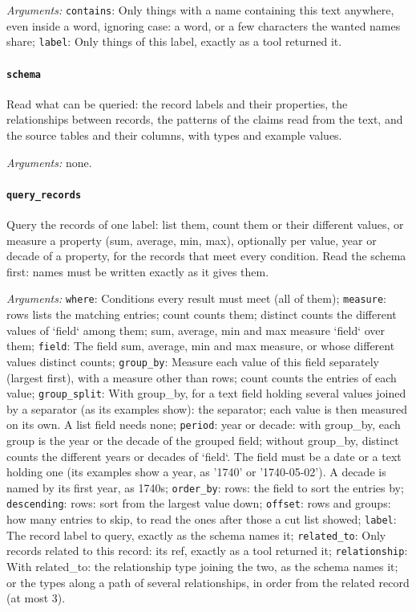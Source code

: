 \noindent\emph{Arguments:} \texttt{contains}: Only things with a name containing this text anywhere, even inside a word, ignoring case: a word, or a few characters the wanted names share; \texttt{label}: Only things of this label, exactly as a tool returned it.

\paragraph{\texttt{schema}} Read what can be queried: the record labels and their properties, the relationships between records, the patterns of the claims read from the text, and the source tables and their columns, with types and example values.

\noindent\emph{Arguments:} none.

\paragraph{\texttt{query\_records}} Query the records of one label: list them, count them or their different values, or measure a property (sum, average, min, max), optionally per value, year or decade of a property, for the records that meet every condition. Read the schema first: names must be written exactly as it gives them.

\noindent\emph{Arguments:} \texttt{where}: Conditions every result must meet (all of them); \texttt{measure}: rows lists the matching entries; count counts them; distinct counts the different values of `field` among them; sum, average, min and max measure `field` over them; \texttt{field}: The field sum, average, min and max measure, or whose different values distinct counts; \texttt{group\_by}: Measure each value of this field separately (largest first), with a measure other than rows; count counts the entries of each value; \texttt{group\_split}: With group\_by, for a text field holding several values joined by a separator (as its examples show): the separator; each value is then measured on its own. A list field needs none; \texttt{period}: year or decade: with group\_by, each group is the year or the decade of the grouped field; without group\_by, distinct counts the different years or decades of `field`. The field must be a date or a text holding one (its examples show a year, as '1740' or '1740-05-02'). A decade is named by its first year, as 1740s; \texttt{order\_by}: rows: the field to sort the entries by; \texttt{descending}: rows: sort from the largest value down; \texttt{offset}: rows and groups: how many entries to skip, to read the ones after those a cut list showed; \texttt{label}: The record label to query, exactly as the schema names it; \texttt{related\_to}: Only records related to this record: its ref, exactly as a tool returned it; \texttt{relationship}: With related\_to: the relationship type joining the two, as the schema names it; or the types along a path of several relationships, in order from the related record (at most 3).

